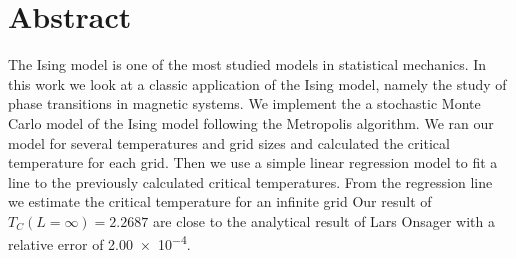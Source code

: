 \section*{Abstract}
The Ising model is one of the most studied models in statistical mechanics. In
this work we look at a classic application of the Ising model, namely
the study of phase transitions in magnetic systems.
We implement the a stochastic Monte Carlo model of the Ising model following the
Metropolis algorithm. We ran our model for several temperatures and grid
sizes and calculated the critical temperature for each grid. Then we use a
simple linear regression model to fit a line to the previously calculated
critical temperatures. From the regression line we estimate the critical
temperature for an infinite grid Our result of $T_C(L=\infty)=2.2687$ are close
to the analytical result of Lars Onsager with a relative error of \num{2.00e-4}.
